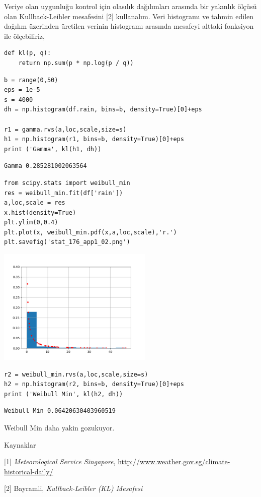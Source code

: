 \documentclass[12pt,fleqn]{article}\usepackage{../../common}
\begin{document}
Veriye olan uygunluğu kontrol için olasılık dağılımları arasında bir yakınlık
ölçüsü olan Kullback-Leibler mesafesini [2] kullanalım. Veri histogramı ve
tahmin edilen dağılım üzerinden üretilen verinin histogramı arasında mesafeyi
alttaki fonksiyon ile ölçebiliriz,

\begin{verbatim}
def kl(p, q):
    return np.sum(p * np.log(p / q))    
\end{verbatim}

\begin{verbatim}
b = range(0,50)
eps = 1e-5
s = 4000
dh = np.histogram(df.rain, bins=b, density=True)[0]+eps

r1 = gamma.rvs(a,loc,scale,size=s)
h1 = np.histogram(r1, bins=b, density=True)[0]+eps
print ('Gamma', kl(h1, dh))
\end{verbatim}

\begin{verbatim}
Gamma 0.285281002063564
\end{verbatim}

\begin{verbatim}
from scipy.stats import weibull_min
res = weibull_min.fit(df['rain'])
a,loc,scale = res  
x.hist(density=True)
plt.ylim(0,0.4)
plt.plot(x, weibull_min.pdf(x,a,loc,scale),'r.')
plt.savefig('stat_176_app1_02.png')
\end{verbatim}

\includegraphics[width=20em]{stat_176_app1_02.png}

\begin{verbatim}
r2 = weibull_min.rvs(a,loc,scale,size=s)
h2 = np.histogram(r2, bins=b, density=True)[0]+eps
print ('Weibull Min', kl(h2, dh))
\end{verbatim}

\begin{verbatim}
Weibull Min 0.06420630403960519
\end{verbatim}

Weibull Min daha yakin gozukuyor.



Kaynaklar

[1] {\em Meteorological Service Singapore},
    \url{http://www.weather.gov.sg/climate-historical-daily/}

[2] Bayramli, {\em Kullback-Leibler (KL) Mesafesi}
    
\end{document}
